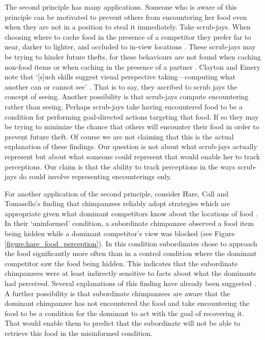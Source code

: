 \documentclass[12pt,\papersize]{extarticle}
\begin{document}
The second principle has many applications.  Someone who is aware of this principle can be motivated to prevent others from encountering her food even when they are not in a position to steal it immediately.  Take scrub-jays.  When choosing where to cache food in the presence of a competitor they prefer far to near, darker to lighter, and occluded to in-view locations \citep[]{en_1451, en_1452}.  These scrub-jays may be trying to hinder future thefts, for these behaviours are not found when caching non-food items \citep[]{en_1419} or when caching in the presence of a partner \citep[][p.\ 514]{Clayton:2007fh, Emery:2007ze}.  Clayton and Emery note that `[s]uch skills suggest visual perspective taking—computing what another can or cannot see' \citep[]{en_1451}. That is to say, they ascribed to scrub jays the concept of seeing.  Another possibility is that scrub-jays compute encountering rather than seeing.  Perhaps scrub-jays take having encountered food to be a condition for performing goal-directed actions targeting that food.  If so they may be trying to minimize the chance that others will encounter their food in order to prevent future theft.  
Of course we  are not claiming that this is the actual explanation of these findings.  
Our question is not about what scrub-jays actually represent but about what someone could represent that would enable her to track perceptions.
Our claim is that the ability to track perceptions in the ways scrub-jays do could involve representing encounterings only.




For another application of the second principle, consider Hare, Call and Tomasello’s finding that chimpanzees reliably adopt strategies which are appropriate given what dominant competitors know about the locations of food \citep[]{en_1545}.  In their `uninformed' condition, a subordinate chimpanzee observed a food item being hidden while a dominant competitor’s view was blocked (see Figure \vref{figure:hare_food_perception}).  In this condition subordinates chose to approach the food significantly more often than in a control condition where the dominant competitor saw the food being hidden.  This indicates that the subordinate chimpanzees were at least indirectly sensitive to facts about what the dominants had perceived.  Several explanations of this finding have already been suggested \citep[]{Call:2008di, en_1551, Suddendorf:2003co}.  A further possibility is that subordinate chimpanzees are aware that the dominant chimpanzee has not encountered the food and take encountering the food to be a condition for the dominant to act with the goal of recovering it.  That would enable them to predict that the subordinate will not be able to retrieve this food in the misinformed condition. 
\end{document}
